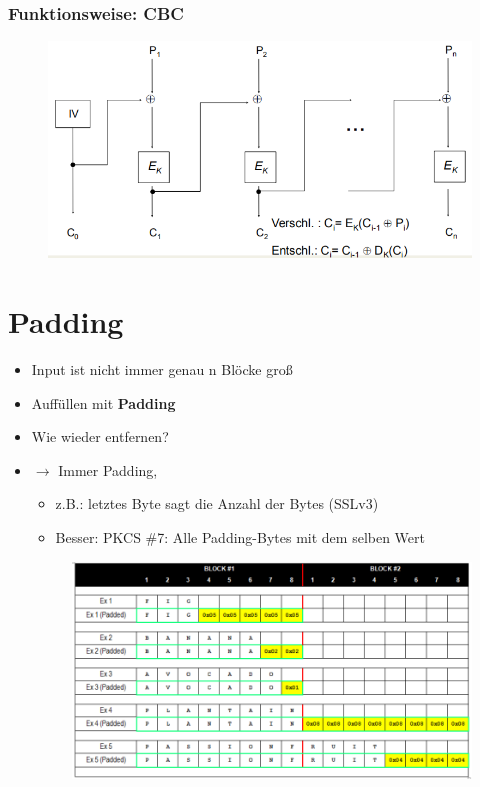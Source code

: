 \documentclass[openany]{book}
\begin{document}
\newpage

\subsubsection{Funktionsweise: CBC}

\begin{figure}[h!]
    \centering
    \includegraphics[width=0.75\linewidth]{Pics/CBC.PNG}
\end{figure}

\section{Padding}

\begin{itemize}
    \item Input ist nicht immer genau n Blöcke groß
    \item Auffüllen mit \textbf{Padding}
    \item Wie wieder entfernen?
    \item $\rightarrow$ Immer Padding,
    \begin{itemize}
        \item z.B.: letztes Byte sagt die Anzahl der Bytes (SSLv3)
        \item Besser: PKCS \#7: Alle Padding-Bytes mit dem selben Wert
    \end{itemize}
    \begin{figure}[h!]
        \centering
        \includegraphics[width=0.85\linewidth]{Pics/Padding.PNG}
    \end{figure} 
\end{itemize}
\end{document}
